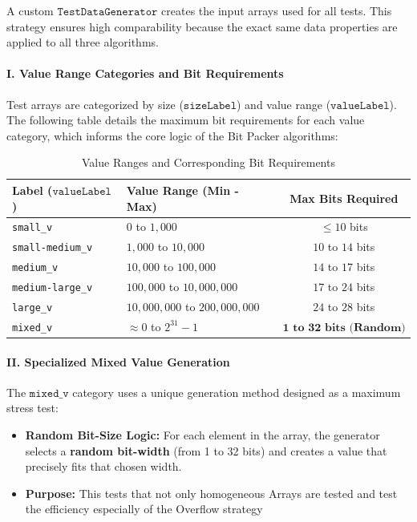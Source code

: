 \documentclass[11pt, a4paper]{article}
\begin{document}
	A custom $\texttt{TestDataGenerator}$ creates the input arrays used for all tests. This strategy ensures high comparability because the exact same data properties are applied to all three algorithms.
	
	\paragraph{I. Value Range Categories and Bit Requirements}
	Test arrays are categorized by size ($\texttt{sizeLabel}$) and value range ($\texttt{valueLabel}$). The following table details the maximum bit requirements for each value category, which informs the core logic of the Bit Packer algorithms:
	
	\begin{table}[H]
		\centering
		\caption{Value Ranges and Corresponding Bit Requirements}
		\label{tab:value_ranges}
		\begin{tabular}{|l|l|c|}
			\hline
			\textbf{Label ($\texttt{valueLabel}$)} & \textbf{Value Range (Min - Max)} & \textbf{Max Bits Required} \\
			\hline
			\texttt{small\_v} & $0$ to $1,000$ & $\le 10$ bits \\
			\texttt{small-medium\_v} & $1,000$ to $10,000$ & $10$ to $14$ bits \\
			\texttt{medium\_v} & $10,000$ to $100,000$ & $14$ to $17$ bits \\
			\texttt{medium-large\_v} & $100,000$ to $10,000,000$ & $17$ to $24$ bits \\
			\texttt{large\_v} & $10,000,000$ to $200,000,000$ & $24$ to $28$ bits \\
			\hline
			\texttt{mixed\_v} & $\approx 0$ to $2^{31}-1$ & $\mathbf{1 \text{ to } 32 \text{ bits (Random)}}$ \\
			\hline
		\end{tabular}
	\end{table}
	
	\paragraph{II. Specialized Mixed Value Generation}
	The $\texttt{mixed\_v}$ category uses a unique generation method designed as a maximum stress test:
	\begin{itemize}
		\item \textbf{Random Bit-Size Logic:} For each element in the array, the generator selects a \textbf{random bit-width} (from 1 to 32 bits) and creates a value that precisely fits that chosen width.
		\item \textbf{Purpose:} This tests that not only homogeneous Arrays are tested and test the efficiency especially of the Overflow strategy
	\end{itemize}
	
\end{document}
